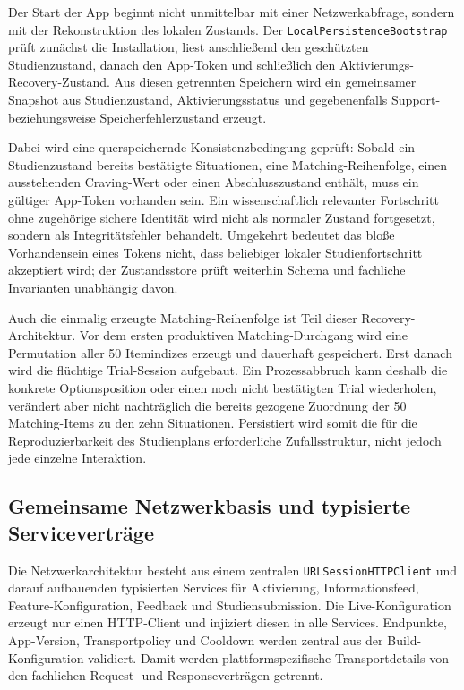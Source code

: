 \begin{neu}
Der Start der App beginnt nicht unmittelbar mit einer Netzwerkabfrage, sondern mit der Rekonstruktion des lokalen Zustands. Der \texttt{LocalPersistenceBootstrap} prüft zunächst die Installation, liest anschließend den geschützten Studienzustand, danach den App-Token und schließlich den Aktivierungs-Recovery-Zustand. Aus diesen getrennten Speichern wird ein gemeinsamer Snapshot aus Studienzustand, Aktivierungsstatus und gegebenenfalls Support- beziehungsweise Speicherfehlerzustand erzeugt.

Dabei wird eine querspeichernde Konsistenzbedingung geprüft: Sobald ein Studienzustand bereits bestätigte Situationen, eine Matching-Reihenfolge, einen ausstehenden Craving-Wert oder einen Abschlusszustand enthält, muss ein gültiger App-Token vorhanden sein. Ein wissenschaftlich relevanter Fortschritt ohne zugehörige sichere Identität wird nicht als normaler Zustand fortgesetzt, sondern als Integritätsfehler behandelt. Umgekehrt bedeutet das bloße Vorhandensein eines Tokens nicht, dass beliebiger lokaler Studienfortschritt akzeptiert wird; der Zustandsstore prüft weiterhin Schema und fachliche Invarianten unabhängig davon.

Auch die einmalig erzeugte Matching-Reihenfolge ist Teil dieser Recovery-Architektur. Vor dem ersten produktiven Matching-Durchgang wird eine Permutation aller 50 Itemindizes erzeugt und dauerhaft gespeichert. Erst danach wird die flüchtige Trial-Session aufgebaut. Ein Prozessabbruch kann deshalb die konkrete Optionsposition oder einen noch nicht bestätigten Trial wiederholen, verändert aber nicht nachträglich die bereits gezogene Zuordnung der 50 Matching-Items zu den zehn Situationen. Persistiert wird somit die für die Reproduzierbarkeit des Studienplans erforderliche Zufallsstruktur, nicht jedoch jede einzelne Interaktion.

\subsection{Gemeinsame Netzwerkbasis und typisierte Serviceverträge}

Die Netzwerkarchitektur besteht aus einem zentralen \texttt{URLSessionHTTPClient} und darauf aufbauenden typisierten Services für Aktivierung, Informationsfeed, Feature-Konfiguration, Feedback und Studiensubmission. Die Live-Konfiguration erzeugt nur einen HTTP-Client und injiziert diesen in alle Services. Endpunkte, App-Version, Transportpolicy und Cooldown werden zentral aus der Build-Konfiguration validiert. Damit werden plattformspezifische Transportdetails von den fachlichen Request- und Responseverträgen getrennt.


\end{neu}
